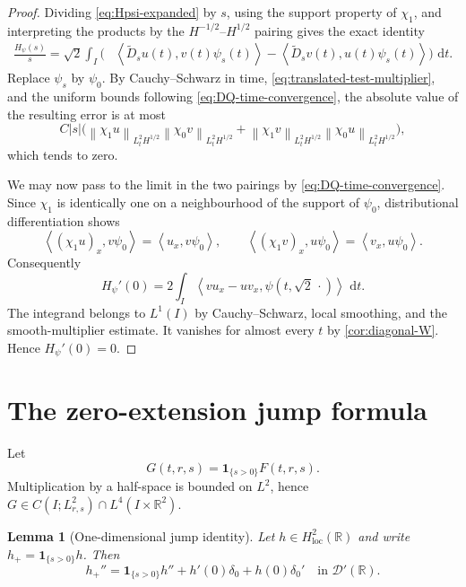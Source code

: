 \documentclass[11pt,oneside]{book}
\newtheorem{lemma}[theorem]{Lemma}
\theoremstyle{definition}
\theoremstyle{remark}
\newcommand{\R}{\mathbb R}
\newcommand{\D}{\mathcal D}
\newcommand{\1}{\mathbf 1}
\newcommand{\loc}{\mathrm{loc}}
\newcommand{\dd}{\,\mathrm d}
\newcommand{\norm}[1]{\left\lVert #1\right\rVert}
\newcommand{\pair}[2]{\left\langle #1,#2\right\rangle}
\begin{document}
\begin{proof}
Dividing \eqref{eq:Hpsi-expanded} by $s$, using the support property of
$\chi_1$, and interpreting the products by the
$H^{-1/2}$--$H^{1/2}$ pairing gives the exact identity
\begin{align}
 \frac{H_\psi(s)}s
 =\sqrt2\int_I\Big(
   &\pair{\widetilde D_su(t)}{v(t)\psi_s(t)}
    -\pair{\widetilde D_sv(t)}{u(t)\psi_s(t)}\Big)\,\dd t.       \label{eq:Hpsi-dq-exact}
\end{align}
Replace $\psi_s$ by $\psi_0$.  By Cauchy--Schwarz in time,
\eqref{eq:translated-test-multiplier}, and the uniform bounds following
\eqref{eq:DQ-time-convergence}, the absolute value of the resulting error is
at most
\[
 C|s|\Big(
   \norm{\chi_1u}_{L^2_tH^{1/2}}
   \norm{\chi_0v}_{L^2_tH^{1/2}}
  +\norm{\chi_1v}_{L^2_tH^{1/2}}
   \norm{\chi_0u}_{L^2_tH^{1/2}}
 \Big),
\]
which tends to zero.

We may now pass to the limit in the two pairings by
\eqref{eq:DQ-time-convergence}.  Since $\chi_1$ is identically one on a
neighbourhood of the support of $\psi_0$, distributional differentiation
shows
\[
 \pair{(\chi_1u)_x}{v\psi_0}=\pair{u_x}{v\psi_0},
 \qquad
 \pair{(\chi_1v)_x}{u\psi_0}=\pair{v_x}{u\psi_0}.
\]
Consequently
\begin{equation}
 H_\psi'(0)
 =2\int_I\pair{vu_x-uv_x}{\psi(t,\sqrt2\,\cdot)}\,\dd t. \label{eq:Hpsi-prime-W}
\end{equation}
The integrand belongs to $L^1(I)$ by Cauchy--Schwarz, local smoothing, and
the smooth-multiplier estimate.  It vanishes for almost every $t$ by
\cref{cor:diagonal-W}.  Hence $H_\psi'(0)=0$.
\end{proof}

\section{The zero-extension jump formula}
Let
\begin{equation}
  G(t,r,s)=\1_{\{s>0\}}F(t,r,s).                   \label{eq:G-def}
\end{equation}
Multiplication by a half-space is bounded on $L^2$, hence
$G\in C(I;L^2_{r,s})\cap L^4(I\times\R^2)$.

\begin{lemma}[One-dimensional jump identity]\label{lem:jump-formula}
Let $h\in H^2_{\loc}(\R)$ and write $h_+=\1_{\{s>0\}}h$.  Then
\begin{equation}
 h_+''=\1_{\{s>0\}}h''+h'(0)\delta_0+h(0)\delta_0'
 \quad\text{in }\D'(\R).                           \label{eq:jump-formula}
\end{equation}
\end{lemma}
\end{document}
